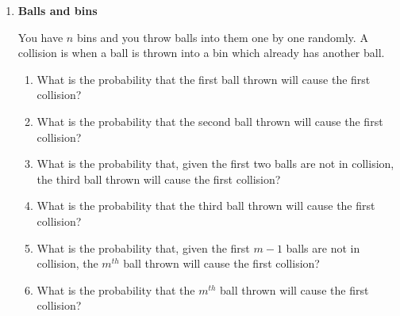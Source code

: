 \documentclass[11pt]{article}
\newif\ifsolutions
\begin{document}
\maketitle


\begin{enumerate}

\item {\bf Balls and bins}
  
  You have $n$ bins and you throw balls into them one by one randomly.
  A collision is when a ball is thrown into a bin which already has another ball.
  \begin{enumerate}
  \item What is the probability that the first ball thrown will cause the first collision?
  \item What is the probability that the second ball thrown will cause the first collision?
  \item What is the probability that, given the first two balls are not in collision, 
    the third ball thrown will cause the first collision?
  \item What is the probability that the third ball thrown will cause the first collision? 
  \item What is the probability that, given the first $m-1$ balls are not in collision, 
    the $m^{th}$ ball thrown will cause the first collision?
  \item What is the probability that the $m^{th}$ ball thrown will cause the first collision? 
  \end{enumerate}

\ifsolutions
{\color{blue}{
  {\bf Solutions:}
  \begin{enumerate}
  \item 0
  \item $\frac{1}{n}$
  \item $\frac{2}{n}$
  \item Basically: $P(\text{Ball 3 collides $|$ Ball 1, 2 do not collide}) \cdot P(\text{Ball 1, 2 do not collide})$

    Which is $\frac{2}{n} \cdot \frac{n-1}{n}$
  \item $\frac{m-1}{n}$
  \item Similar to (d), $\frac{m-1}{n} \cdot \frac{n-1}{n} \cdot \frac{n-2}{n} \cdot \hdots \cdot \frac{n-m+2}{n} = 
    \frac{m-1}{n} \cdot \prod\limits_{i=0}^{m-2} \frac{n-i}{n}$
  \end{enumerate}
}}
\fi



\end{enumerate}
\end{document}
